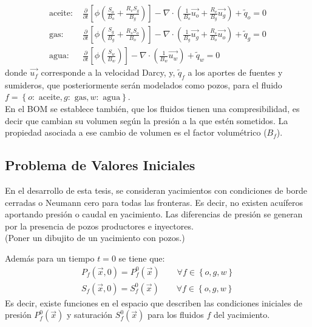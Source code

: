 \begin{align}
\label{ec:aceite}
\text{aceite: }&\frac{\partial}{\partial t} \left[ \phi \left( \frac{S_{o}}{B_{o}} + \frac{R_{v} S_{g}}{B_{g}} \right) \right]
- \nabla \cdot \left( \frac{1}{B_{o}} \vec{u_{o}} + \frac{R_{v}}{B_{g}} \vec{u_{g}} \right) + \tilde{q}_{o}=0  \\
\label{ec:gas}
\text{gas: }&\frac{\partial}{\partial t} \left[ \phi \left( \frac{S_{g}}{B_{g}} + \frac{R_{s} S_{o}}{B_{o}} \right) \right]
- \nabla \cdot \left( \frac{1}{B_{g}} \vec{u_{g}} + \frac{R_{s}}{B_{o}} \vec{u_{o}} \right) + \tilde{q}_{g} = 0 \\
\label{ec:agua}
\text{agua: }&\frac{\partial}{\partial t} \left[\phi \left( \frac{S_{w}}{B_{w}} \right) \right] - \nabla \cdot \left( \frac{1}{B_{w}} \vec{u_{w}} \right) + \tilde{q}_{w} = 0 
\end{align}
donde $\vec{u_{f}}$ corresponde a la velocidad Darcy, y, $\tilde{q}_{f}$ a los aportes de fuentes y sumideros, que posteriormente serán modelados como pozos, para el fluido $f = \left\lbrace o:\text{ aceite}, g:\text{ gas}, w:\text{ agua} \right\rbrace $.\\

En el BOM se establece también, que los fluidos tienen una compresibilidad, es decir que cambian su volumen según la presión a la que estén sometidos. La propiedad asociada a ese cambio de volumen es el factor volumétrico ($B_{f}$).


\subsection{Problema de Valores Iniciales}

En el desarrollo de esta tesis, se consideran yacimientos con condiciones de borde cerradas o Neumann cero para todas las fronteras. Es decir, no existen acuíferos aportando presión o caudal en yacimiento. Las diferencias de presión se generan por la presencia de pozos productores e inyectores.\\

(Poner un dibujito de un yacimiento con pozos.)

Además para un tiempo $t=0$ se tiene que:
\begin{align}
	P_{f}(\vec{x},0) = P^{0}_{f}(\vec{x}) \qquad \forall f \in \left\lbrace o,g,w\right\rbrace\\
	S_{f}(\vec{x},0) = S^{0}_{f}(\vec{x}) \qquad \forall f \in \left\lbrace o,g,w\right\rbrace
\end{align}
%
Es decir, existe funciones en el espacio que describen las condiciones iniciales de presión $P^{0}_{f}(\vec{x})$ y saturación $S^{0}_{f}(\vec{x})$ para los fluidos $f$ del yacimiento.

